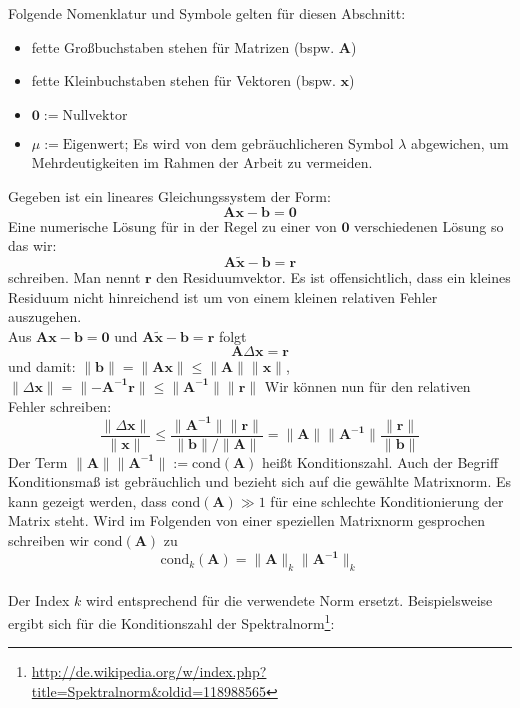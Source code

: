 {
\small
Folgende Nomenklatur und Symbole gelten für diesen Abschnitt:
\begin{itemize}[itemsep=0mm]
	\item	fette Großbuchstaben stehen für Matrizen (bspw. $\mathbf{A}$)
	\item	fette Kleinbuchstaben stehen für Vektoren (bspw. $\mathbf{x}$)
	\item	$\mathbf{0} := \text{Nullvektor}$
	\item	$\mu := \text{Eigenwert}$; Es wird von dem gebräuchlicheren Symbol $\lambda$ abgewichen, um Mehrdeutigkeiten im Rahmen der Arbeit zu vermeiden.
\end{itemize} 
%
Gegeben ist ein lineares Gleichungssystem der Form:
$$ \mathbf{A}\mathbf{x}-\mathbf{b} =\mathbf{0} $$
Eine numerische Lösung für in der Regel zu einer von $\mathbf{0}$ verschiedenen Lösung so das wir:
$$ \mathbf{A}\mathbf{\tilde{x}}-\mathbf{b} =\mathbf{r} $$
schreiben. Man nennt $\mathbf{r}$ den Residuumvektor. Es ist offensichtlich, dass ein kleines Residuum nicht hinreichend ist um von einem kleinen relativen Fehler auszugehen.\\
Aus $\mathbf{A}\mathbf{x}-\mathbf{b} =\mathbf{0}$ und $\mathbf{A}\mathbf{\tilde{x}}-\mathbf{b} =\mathbf{r}$ folgt $$ \mathbf{A}\Delta\mathbf{x}=\mathbf{r}$$
und damit:
$ 
\lVert \mathbf{b} \rVert=\lVert \mathbf{Ax} \rVert \leq \lVert \mathbf{A} \rVert \lVert \mathbf{x} \rVert
$, 
$
\lVert \Delta\mathbf{x} \rVert=\lVert -\mathbf{A^{-1}r} \rVert \leq \lVert \mathbf{A^{-1}} \rVert \lVert \mathbf{r} \rVert
$
Wir können nun für den relativen Fehler schreiben:
$$
\frac{\lVert \Delta\mathbf{x} \rVert}{\lVert \mathbf{x} \rVert} \leq 
\frac{\lVert \mathbf{A^{-1}} \rVert \lVert \mathbf{r} \rVert}{\lVert \mathbf{b} \rVert / \lVert \mathbf{A} \rVert} =
\lVert \mathbf{A} \rVert \lVert \mathbf{A^{-1}} \rVert \frac{\lVert \mathbf{r} \rVert}{\lVert \mathbf{b} \rVert}
$$
Der Term $\lVert \mathbf{A} \rVert \lVert \mathbf{A^{-1}} \rVert := \text{cond}(\mathbf{A})$ heißt Konditionszahl. Auch der Begriff Konditionsmaß ist gebräuchlich und bezieht sich auf die gewählte Matrixnorm.
Es kann gezeigt werden, dass $\text{cond}(\mathbf{A}) \gg 1$  für eine schlechte Konditionierung der Matrix steht. Wird im Folgenden von einer speziellen Matrixnorm gesprochen schreiben wir $\text{cond}(\mathbf{A})$ zu 
$$ 
\text{cond}_k(\mathbf{A}) = \lVert \mathbf{A} \rVert_k \lVert \mathbf{A^{-1}} \rVert_k
$$ \\
Der Index $k$ wird entsprechend für die verwendete Norm ersetzt. Beispielsweise ergibt sich für die Konditionszahl der Spektralnorm\footnote{\url{http://de.wikipedia.org/w/index.php?title=Spektralnorm&oldid=118988565}}:
}
